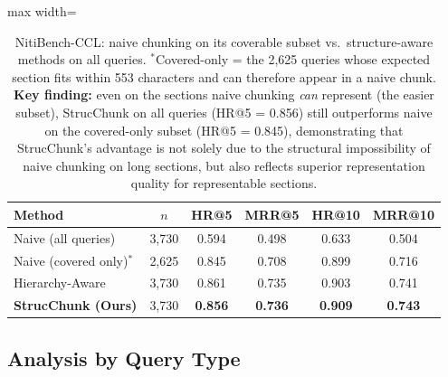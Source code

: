 \documentclass[sn-mathphys,Numbered]{sn-jnl}%
\begin{document}
\begin{table}[htbp]
\centering
\begin{adjustbox}{max width=\textwidth}
\begin{tabular}{lccccc}
\toprule
\textbf{Method} & \textbf{$n$} & \textbf{HR@5} & \textbf{MRR@5}
               & \textbf{HR@10} & \textbf{MRR@10} \\
\midrule
Naive (all queries)       & 3,730 & 0.594 & 0.498 & 0.633 & 0.504 \\
Naive (covered only)$^*$  & 2,625 & 0.845 & 0.708 & 0.899 & 0.716 \\
Hierarchy-Aware           & 3,730 & 0.861 & 0.735 & 0.903 & 0.741 \\
\textbf{StrucChunk (Ours)}& 3,730 & \textbf{0.856} & \textbf{0.736}
                          & \textbf{0.909} & \textbf{0.743} \\
\bottomrule
\end{tabular}
\end{adjustbox}
\caption{NitiBench-CCL: naive chunking on its coverable subset vs.\
  structure-aware methods on all queries.
  $^*$Covered-only = the 2,625 queries whose expected section fits within
  553 characters and can therefore appear in a naive chunk.
  \textbf{Key finding:} even on the sections naive chunking \emph{can}
  represent (the easier subset), StrucChunk on all queries (HR@5 = 0.856)
  still outperforms naive on the covered-only subset (HR@5 = 0.845),
  demonstrating that StrucChunk's advantage is not solely due to the
  structural impossibility of naive chunking on long sections, but also
  reflects superior representation quality for representable sections.}
\label{tab:niti_covered}
\end{table}

\subsection{Analysis by Query Type}
\end{document}
